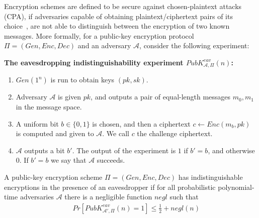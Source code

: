 Encryption schemes are defined to be secure against chosen-plaintext attacks (CPA), if adversaries capable of obtaining plaintext/ciphertext pairs of its choice~\cite[page 20]{katz2014introduction}, are not able to distinguish between the encryption of two known messages.
More formally, for a public-key encryption protocol $\Pi = (Gen, Enc, Dec)$ and an adversary $\mathcal{A}$, consider the following experiment:~\cite[page 378]{katz2014introduction}

\vspace{1em}
\noindent\textbf{The eavesdropping indistinguishability experiment $PubK^{eav}_{\mathcal{A}, \Pi}(n)$:}
\begin{enumerate}

    \item $Gen(1^n)$ is run to obtain keys $(pk,sk)$.
    
    \item Adversary $\mathcal{A}$ is given $pk$, and outputs a pair of equal-length messages $m_0, m_1$ in the message space.
    
    \item A uniform bit $b \in \{0, 1\}$ is chosen, and then a ciphertext $c \leftarrow Enc(m_b, pk)$ is computed and given to $\mathcal{A}$. We call $c$ the challenge ciphertext.
    
    \item $\mathcal{A}$ outputs a bit $b'$. The output of the experiment is $1$ if $b' = b$, and otherwise $0$. If $b' = b$ we say that $\mathcal{A}$ succeeds.
    
\end{enumerate}

\begin{definition}
A public-key encryption scheme $\Pi = (Gen, Enc, Dec)$ has indistinguishable encryptions in the presence of an eavesdropper if for all probabilistic polynomial-time adversaries $\mathcal{A}$ there is a negligible function $negl$ such that
{\setlength{\mathindent}{0cm}
\begin{align*}
&& Pr\left[ PubK^{eav}_{\mathcal{A'}, \Pi}(n)  = 1 \right] \leq \frac{1}{2} + negl(n)
\end{align*}}
\end{definition}


